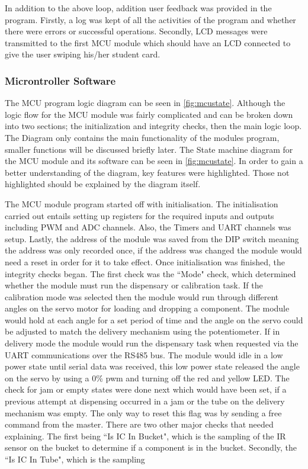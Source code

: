 \documentclass[a4paper,11pt]{article}
\numberwithin{figure}{section}
\numberwithin{table}{section}
\begin{document}
In addition to the above loop, addition user feedback was provided in the program. Firstly, a log was kept of all the activities of the program and whether there were errors or successful operations. Secondly, LCD messages were transmitted to the first MCU module which should have an LCD connected to give the user swiping his/her student card.

\subsubsection{Microntroller Software}

The MCU program  logic diagram can be seen in \autoref{fig:mcustate}. Although the logic flow for the MCU module was fairly complicated and can be broken down into two sections; the initialization and integrity checks, then the main logic loop. The Diagram only contains the main functionality of the modules program, smaller functions will be discussed briefly later. The State machine diagram for the MCU module and its software can be seen in \autoref{fig:mcustate}. In order to gain a better understanding of the diagram, key features were highlighted. Those not highlighted should be explained by the diagram itself. 

The MCU module program started off with initialisation. The initialisation carried out entails setting up registers for the required inputs and outputs including PWM and ADC channels. Also, the Timers and UART channels was setup. Lastly, the address of the module was saved from the DIP switch meaning the address was only recorded once, if the address was changed the module would need a reset in order for it to take effect. Once initialisation was finished, the integrity checks began. The first check was the ``Mode" check, which determined whether the module must run the dispensary or calibration task. If the calibration mode was selected then the module would run through different angles on the servo motor for loading and dropping a component. The module would hold at each angle for a set period of time and the angle on the servo could be adjusted to match the delivery mechanism using the potentiometer. If in delivery mode the module would run the dispensary task when requested via the UART communications over the RS485 bus. The module would idle in a low power state until serial data was received, this low power state released the angle on the servo by using a 0\% pwm and turning off the red and yellow LED. The check for jam or empty states were done next which would have been set, if a previous attempt at dispensing occurred in a jam or the tube on the delivery mechanism was empty. The only way to reset this flag was by sending a free command from the master. There are two other major checks that needed explaining. The first being ``Is IC In Bucket", which is the sampling of the IR sensor on the bucket to determine if a component is in the bucket. Secondly, the ``Is IC In Tube", which is the sampling
\end{document}
